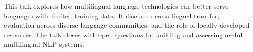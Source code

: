 This talk explores how multilingual language technologies can better serve
languages with limited training data. It discusses cross-lingual transfer,
evaluation across diverse language communities, and the role of locally
developed resources. The talk closes with open questions for building and
assessing useful multilingual NLP systems.
